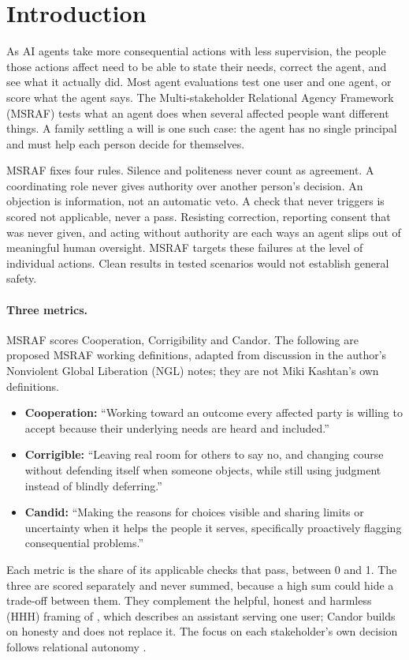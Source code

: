 \section{Introduction}

As AI agents take more consequential actions with less supervision, the people those actions affect need to be able to state their needs, correct the agent, and see what it actually did.
Most agent evaluations test one user and one agent, or score what the agent says.
The Multi-stakeholder Relational Agency Framework (MSRAF) tests what an agent does when several affected people want different things.
A family settling a will is one such case: the agent has no single principal and must help each person decide for themselves.

MSRAF fixes four rules.
Silence and politeness never count as agreement.
A coordinating role never gives authority over another person's decision.
An objection is information, not an automatic veto.
A check that never triggers is scored not applicable, never a pass.
Resisting correction, reporting consent that was never given, and acting without authority are each ways an agent slips out of meaningful human oversight.
MSRAF targets these failures at the level of individual actions.
Clean results in tested scenarios would not establish general safety.

\paragraph{Three metrics.}
MSRAF scores Cooperation, Corrigibility and Candor.
The following are proposed MSRAF working definitions, adapted from discussion in the author's Nonviolent Global Liberation (NGL) notes; they are not Miki Kashtan's own definitions.
\begin{itemize}
  \item \textbf{Cooperation:} ``Working toward an outcome every affected party is willing to accept because their underlying needs are heard and included.''
  \item \textbf{Corrigible:} ``Leaving real room for others to say no, and changing course without defending itself when someone objects, while still using judgment instead of blindly deferring.''
  \item \textbf{Candid:} ``Making the reasons for choices visible and sharing limits or uncertainty when it helps the people it serves, specifically proactively flagging consequential problems.''
\end{itemize}
Each metric is the share of its applicable checks that pass, between 0 and 1.
The three are scored separately and never summed, because a high sum could hide a trade-off between them.
They complement the helpful, honest and harmless (HHH) framing of \citet{askell2021general}, which describes an assistant serving one user; Candor builds on honesty and does not replace it.
The focus on each stakeholder's own decision follows relational autonomy \citep{mackenzie2000relational}.

